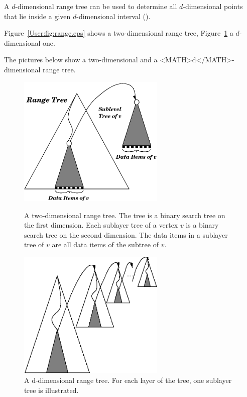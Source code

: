 A $d$-dimensional range tree can be used to determine all
$d$-dimensional points that lie inside  a given $d$-dimensional
interval ().
\begin{ccTexOnly}
Figure~\ref{User:fig:range.eps} shows a two-dimensional range tree,
Figure~\ref{User:fig:d-range.eps} a $d$-dimensional one.
\end{ccTexOnly}
\begin{ccHtmlOnly}
The pictures below show a two-dimensional and a <MATH>d</MATH>-dimensional
range tree.
\end{ccHtmlOnly}
\begin{ccTexOnly}
    \begin{figure}[htbp]
    \begin{minipage}{7cm}
    \begin{center}
    \includegraphics[width=7cm,clip]{range2.eps}
    \end{center}
    \caption{\label{User:fig:range.eps}A two-dimensional range tree. The
      tree is a binary search tree on the first dimension. Each
      sublayer tree of a vertex $v$ is a binary search tree on the second
      dimension. The data items in a sublayer tree of $v$ are
      all data items of the subtree of $v$.}
    \end{minipage}
    \hspace*{1em}
    \begin{minipage}{7cm}
    \begin{center}
    \includegraphics[width=7cm,clip]{d-range.eps}
    \end{center}
    \caption{\label{User:fig:d-range.eps}A d-dimensional range tree. For
      each layer of the tree, one
      sublayer tree is illustrated.}
    \vspace{2\baselineskip}
    \end{minipage}
    \end{figure}
\end{ccTexOnly}

